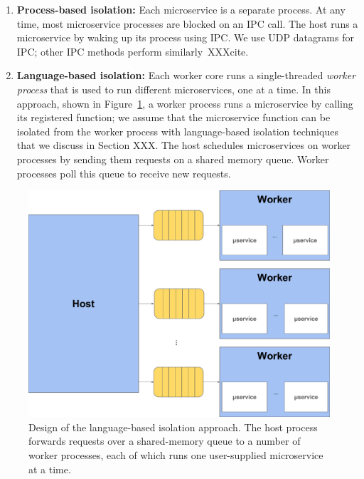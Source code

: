 \begin{enumerate}
\item \textbf{Process-based isolation:} Each microservice is a separate process.
At any time, most microservice processes are blocked on an IPC
call. The host runs a microservice by waking up its process using IPC. We use
UDP datagrams for IPC; other IPC methods perform similarly~XXXcite.
\item \textbf{Language-based isolation:} Each worker core runs a single-threaded
\emph{worker process} that is used to run different microservices, one at a time.
In this approach, shown in Figure~\ref{fig:sysdesign}, a worker process runs a
microservice by calling its registered
function; we assume that the microservice function can be isolated from the
worker process with language-based isolation techniques that we discuss in
Section XXX. The host schedules microservices on worker processes by sending them
requests on a shared memory queue. Worker processes poll this queue to receive
new requests.
\end{enumerate}

\begin{figure}
\includegraphics[width=\columnwidth]{figs/system}
\caption{Design of the language-based isolation approach.  The host process forwards
requests over a shared-memory queue to a number of worker processes, each of which
runs one user-supplied microservice at a time.}
\label{fig:sysdesign}
\end{figure}

